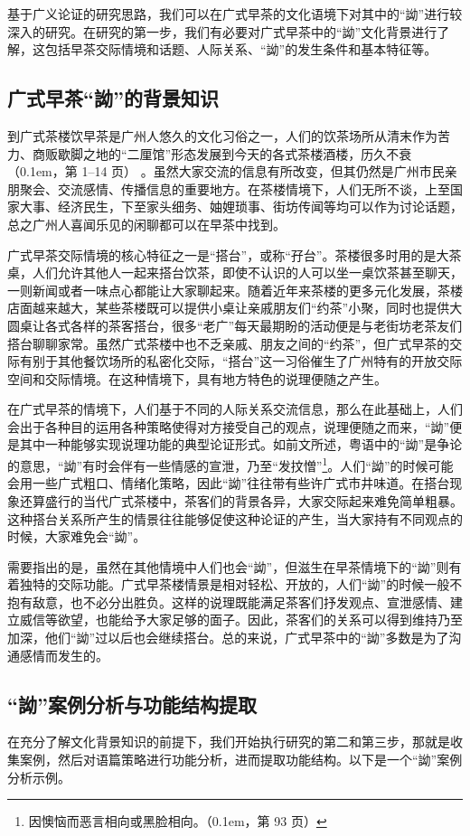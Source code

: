 \documentclass[b5paper,10.5pt,onecolumn,twoside,leqno,UTF8]{article}
\newcommand{\pcr}[1]{\raise0.1em\hbox{\parencite{#1}}}
\newcommand{\pc}[2]{（\pcr{#1}，第 #2 页）}
\begin{document}
基于广义论证的研究思路，我们可以在广式早茶的文化语境下对其中的“詏”进行较深入的研究。在研究的第一步，我们有必要对广式早茶中的“詏”文化背景进行了解，这包括早茶交际情境和话题、人际关系、“詏”的发生条件和基本特征等。

\subsection{广式早茶“詏”的背景知识}

到广式茶楼饮早茶是广州人悠久的文化习俗之一，人们的饮茶场所从清末作为苦力、商贩歇脚之地的“二厘馆”形态发展到今天的各式茶楼酒楼，历久不衰\pc{mo}{1--14} 。虽然大家交流的信息有所改变，但其仍然是广州市民亲朋聚会、交流感情、传播信息的重要地方。在茶楼情境下，人们无所不谈，上至国家大事、经济民生，下至家头细务、妯娌琐事、街坊传闻等均可以作为讨论话题，总之广州人喜闻乐见的闲聊都可以在早茶中找到。

广式早茶交际情境的核心特征之一是“搭台”，或称“孖台”。茶楼很多时用的是大茶桌，人们允许其他人一起来搭台饮茶，即使不认识的人可以坐一桌饮茶甚至聊天，一则新闻或者一味点心都能让大家聊起来。随着近年来茶楼的更多元化发展，茶楼店面越来越大，某些茶楼既可以提供小桌让亲戚朋友们“约茶”小聚，同时也提供大圆桌让各式各样的茶客搭台，很多“老广”每天最期盼的活动便是与老街坊老茶友们搭台聊聊家常。虽然广式茶楼中也不乏亲戚、朋友之间的“约茶”，但广式早茶的交际有别于其他餐饮场所的私密化交际，“搭台”这一习俗催生了广州特有的开放交际空间和交际情境。在这种情境下，具有地方特色的说理便随之产生。

在广式早茶的情境下，人们基于不同的人际关系交流信息，那么在此基础上，人们会出于各种目的运用各种策略使得对方接受自己的观点，说理便随之而来，“詏”便是其中一种能够实现说理功能的典型论证形式。如前文所述，粤语中的“詏”是争论的意思，“詏”有时会伴有一些情感的宣泄，乃至“发抆憎”\footnote{因懊恼而恶言相向或黑脸相向。\pc{zhang}{93}}。人们“詏”的时候可能会用一些广式粗口、情绪化策略，因此“詏”往往带有些许广式市井味道。在搭台现象还算盛行的当代广式茶楼中，茶客们的背景各异，大家交际起来难免简单粗暴。这种搭台关系所产生的情景往往能够促使这种论证的产生，当大家持有不同观点的时候，大家难免会“詏”。

需要指出的是，虽然在其他情境中人们也会“詏”，但滋生在早茶情境下的“詏”则有着独特的交际功能。广式早茶楼情景是相对轻松、开放的，人们“詏”的时候一般不抱有敌意，也不必分出胜负。这样的说理既能满足茶客们抒发观点、宣泄感情、建立威信等欲望，也能给予大家足够的面子。因此，茶客们的关系可以得到维持乃至加深，他们“詏”过以后也会继续搭台。总的来说，广式早茶中的“詏”多数是为了沟通感情而发生的。

\subsection{“詏”案例分析与功能结构提取}
在充分了解文化背景知识的前提下，我们开始执行研究的第二和第三步，那就是收集案例，然后对语篇策略进行功能分析，进而提取功能结构。以下是一个“詏”案例分析示例。
\end{document}
